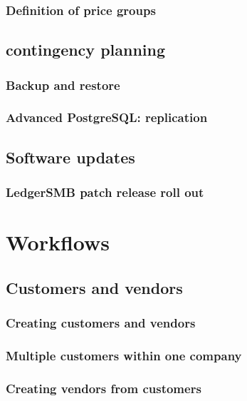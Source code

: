 \documentclass[10pt,A4]{book}
\begin{document}
\section{Definition of price groups}

\chapter{contingency planning}

\section{Backup and restore}

\section{Advanced PostgreSQL: replication}

\chapter{Software updates}

\section{LedgerSMB patch release roll out}





\part{Workflows}
\label{part:Workflows}

\chapter{Customers and vendors}

\section{Creating customers and vendors}

\section{Multiple customers within one company}

\section{Creating vendors from customers}
\end{document}

